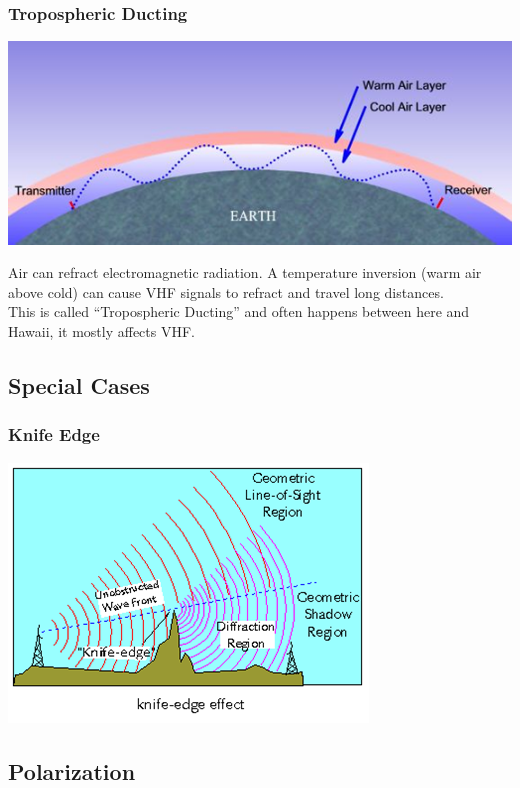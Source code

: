 \documentclass[10pt, handout]{beamer}
\begin{document}
\begin{frame}
\frametitle{Tropospheric Ducting}
\begin{center}
\includegraphics[width=\textwidth]{troposhpere.png}
\end{center}
Air can refract electromagnetic radiation. A temperature inversion (warm air above cold) can cause VHF signals to refract and travel long distances.\\
This is called ``Tropospheric Ducting'' and often happens between here and Hawaii, it mostly affects VHF.
\end{frame}

\subsection{Special Cases}

\begin{frame}
\frametitle{Knife Edge}
\begin{center}
\includegraphics[height=.9\textheight]{knifeedge.png}
\end{center}
\end{frame}

\subsection{Polarization}
\end{document}
